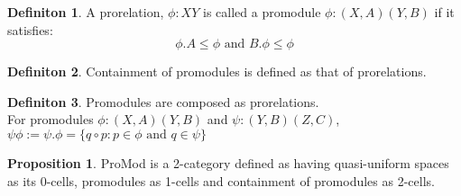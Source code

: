 \documentclass[18pt,a4paper]{article}
\makeatletter
\theoremstyle{definition}
\newtheorem{definition}{Definiton}[section]
\newtheorem{proop}{Proposition}[section]
\newcommand{\carrow}{}%
\DeclareRobustCommand{\carrow}{%
	\mathrel{\vphantom{\rightarrow}\mathpalette\circle@arrow\relax}%
}
\newcommand{\circle@arrow}[2]{%
	\m@th
	\ooalign{%
		\hidewidth$#1\circ\mkern1mu$\hidewidth\cr
	$#1\longrightarrow$\cr}%
}
\makeatother
\begin{document}
	\begin{definition}%
		A prorelation, $\phi:X \carrow Y$ is called a promodule $\phi: (X,A) \carrow (Y,B)$  if it
		satisfies:
		\[ \phi.A \leq \phi \text{ and } B. \phi \leq \phi \]
	\end{definition}
	\begin{definition} %
		Containment of promodules is defined as that of prorelations.
	\end{definition}
	\begin{definition} %
		Promodules are composed as prorelations.\\
		For promodules $\phi: (X,A) \carrow (Y,B)$ and $\psi:(Y,B)\carrow(Z,C)$,
		$\psi \phi := \psi.\phi = \{q \circ p :p\in \phi \text{ and } q \in \psi \}$
	\end{definition}
	\begin{proop}%
		ProMod is a 2-category defined as having quasi-uniform spaces as its 0-cells,
		promodules as 1-cells and containment of promodules as 2-cells.
	\end{proop}
\end{document}
